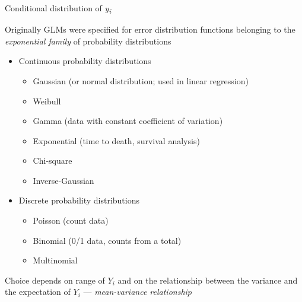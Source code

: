 \documentclass[10pt,ignorenonframetext,compress, aspectratio=169]{beamer}
\providecommand{\tightlist}{%
  \setlength{\itemsep}{0pt}\setlength{\parskip}{0pt}}
\begin{document}
\begin{frame}{Conditional distribution of \emph{y\textsubscript{i}}}

Originally GLMs were specified for error distribution functions
belonging to the \emph{exponential family} of probability distributions

\begin{itemize}
\tightlist
\item
  Continuous probability distributions

  \begin{itemize}
  \tightlist
  \item
    Gaussian (or normal distribution; used in linear regression)
  \item
    Weibull
  \item
    Gamma (data with constant coefficient of variation)
  \item
    Exponential (time to death, survival analysis)
  \item
    Chi-square
  \item
    Inverse-Gaussian
  \end{itemize}
\item
  Discrete probability distributions

  \begin{itemize}
  \tightlist
  \item
    Poisson (count data)
  \item
    Binomial (0/1 data, counts from a total)
  \item
    Multinomial
  \end{itemize}
\end{itemize}

Choice depends on range of \(Y_i\) and on the relationship between the
variance and the expectation of \(Y_i\) --- \emph{mean-variance
relationship}

\end{frame}
\end{document}
